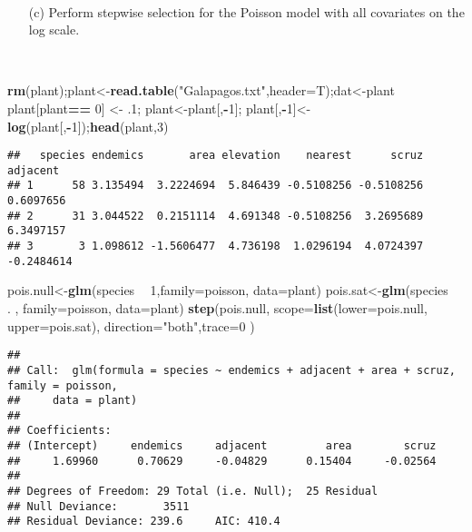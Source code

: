 \documentclass[]{article}
\newenvironment{Shaded}{\begin{snugshade}}{\end{snugshade}}
\newcommand{\KeywordTok}[1]{\textcolor[rgb]{0.13,0.29,0.53}{\textbf{#1}}}
\newcommand{\DataTypeTok}[1]{\textcolor[rgb]{0.13,0.29,0.53}{#1}}
\newcommand{\DecValTok}[1]{\textcolor[rgb]{0.00,0.00,0.81}{#1}}
\newcommand{\StringTok}[1]{\textcolor[rgb]{0.31,0.60,0.02}{#1}}
\newcommand{\OperatorTok}[1]{\textcolor[rgb]{0.81,0.36,0.00}{\textbf{#1}}}
\newcommand{\NormalTok}[1]{#1}
\begin{document}
~

\begin{itemize}
\item[(c)] Perform stepwise selection for the Poisson model with all covariates on the log scale.
\end{itemize}

~

\begin{Shaded}
\begin{Highlighting}[]
\KeywordTok{rm}\NormalTok{(plant);plant<-}\KeywordTok{read.table}\NormalTok{(}\StringTok{"Galapagos.txt"}\NormalTok{,}\DataTypeTok{header=}\NormalTok{T);dat<-plant}
\NormalTok{plant[plant}\OperatorTok{==}\StringTok{ }\DecValTok{0}\NormalTok{] <-}\StringTok{ }\NormalTok{.}\DecValTok{1}\NormalTok{; plant<-plant[,}\OperatorTok{-}\DecValTok{1}\NormalTok{]; plant[,}\OperatorTok{-}\DecValTok{1}\NormalTok{]<-}\KeywordTok{log}\NormalTok{(plant[,}\OperatorTok{-}\DecValTok{1}\NormalTok{]);}\KeywordTok{head}\NormalTok{(plant,}\DecValTok{3}\NormalTok{)}
\end{Highlighting}
\end{Shaded}

\begin{verbatim}
##   species endemics       area elevation    nearest      scruz   adjacent
## 1      58 3.135494  3.2224694  5.846439 -0.5108256 -0.5108256  0.6097656
## 2      31 3.044522  0.2151114  4.691348 -0.5108256  3.2695689  6.3497157
## 3       3 1.098612 -1.5606477  4.736198  1.0296194  4.0724397 -0.2484614
\end{verbatim}

\begin{Shaded}
\begin{Highlighting}[]
\NormalTok{pois.null<-}\KeywordTok{glm}\NormalTok{(species }\OperatorTok{~}\StringTok{ }\DecValTok{1}\NormalTok{,}\DataTypeTok{family=}\NormalTok{poisson, }\DataTypeTok{data=}\NormalTok{plant)}
\NormalTok{pois.sat<-}\KeywordTok{glm}\NormalTok{(species }\OperatorTok{~}\StringTok{ }\NormalTok{. , }\DataTypeTok{family=}\NormalTok{poisson, }\DataTypeTok{data=}\NormalTok{plant)}
\KeywordTok{step}\NormalTok{(pois.null, }\DataTypeTok{scope=}\KeywordTok{list}\NormalTok{(}\DataTypeTok{lower=}\NormalTok{pois.null,     }\DataTypeTok{upper=}\NormalTok{pois.sat), }\DataTypeTok{direction=}\StringTok{"both"}\NormalTok{,}\DataTypeTok{trace=}\DecValTok{0}\NormalTok{  )}
\end{Highlighting}
\end{Shaded}

\begin{verbatim}
## 
## Call:  glm(formula = species ~ endemics + adjacent + area + scruz, family = poisson, 
##     data = plant)
## 
## Coefficients:
## (Intercept)     endemics     adjacent         area        scruz  
##     1.69960      0.70629     -0.04829      0.15404     -0.02564  
## 
## Degrees of Freedom: 29 Total (i.e. Null);  25 Residual
## Null Deviance:       3511 
## Residual Deviance: 239.6     AIC: 410.4
\end{verbatim}
\end{document}
